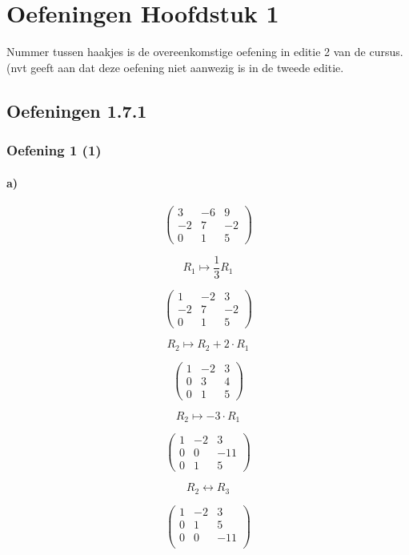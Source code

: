 \documentclass[lineaire_algebra_oplossingen.tex]{subfiles}
\begin{document}
\chapter{Oefeningen Hoofdstuk 1}
Nummer tussen haakjes is de overeenkomstige oefening in editie 2 van de cursus. (nvt geeft aan dat deze oefening niet aanwezig is in de tweede editie.
\section{Oefeningen 1.7.1}
\subsection{Oefening 1 (1)}
\subsubsection*{a)}
$$\begin{pmatrix}
3 & -6 & 9\\
-2 & 7 & -2\\
0 & 1 & 5
\end{pmatrix}
$$

$$ R_1 \longmapsto \frac{1}{3} R_1$$

$$\begin{pmatrix}
1 & -2 & 3\\
-2 & 7 & -2\\
0 & 1 & 5
\end{pmatrix}
$$

$$R_2 \longmapsto R_2 + 2\cdot R_1$$

$$\begin{pmatrix}
1 & -2 & 3\\
0 & 3 & 4\\
0 & 1 & 5
\end{pmatrix}
$$

$$ R_2 \longmapsto - 3\cdot R_1 $$

$$\begin{pmatrix}
1 & -2 & 3\\
0 & 0 & -11\\
0 & 1 & 5
\end{pmatrix}
$$

$$R_2 \leftrightarrow R_3$$

$$\begin{pmatrix}
1 & -2 & 3\\
0 & 1 & 5\\
0 & 0 & -11\\
\end{pmatrix}
$$
\end{document}

